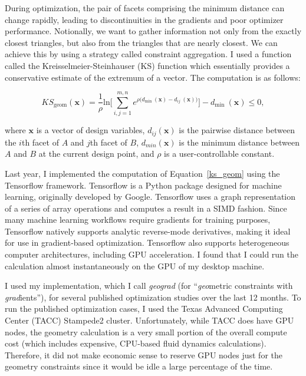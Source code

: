 \documentclass[11pt,letterpaper]{article}
\begin{document}
\qquad During optimization, the pair of facets comprising the minimum distance can change rapidly, leading to discontinuities in the gradients and poor optimizer performance.
Notionally, we want to gather information not only from the exactly closest triangles, but also from the triangles that are nearly closest.
We can achieve this by using a strategy called constraint aggregation.
I used a function called the Kreisselmeier-Steinhauser (KS) function which essentially provides a conservative estimate of the extremum of a vector.
The computation is as follows:

\begin{equation}
  \label{ks_geom}
  KS_\text{geom}(\textbf{x}) = \frac{1}{\rho} \textrm{ln} \Bigg[\sum_{i,j=1}^{m,n} e^{\rho\big(d_\text{min}\:(\textbf{x})-d_{ij}\:(\textbf{x})\big)}\Bigg] - d_\text{min}\:(\textbf{x}) \leq 0 ,
\end{equation}

where $\textbf{x}$ is a vector of design variables,
$d_{ij}(\textbf{x})$ is the pairwise distance between the $i$th facet of $A$ and $j$th facet of $B$,
$d_{min}(\textbf{x})$ is the minimum distance between $A$ and $B$ at the current design point, and
$\rho$ is a user-controllable constant.

\qquad Last year, I implemented the computation of Equation~\ref{ks_geom} using the Tensorflow framework. %
Tensorflow is a Python package designed for machine learning, originally developed by Google.
Tensorflow uses a graph representation of a series of array operations and computes a result in a SIMD fashion.
Since many machine learning workflows require gradients for training purposes, Tensorflow natively supports analytic reverse-mode derivatives, making it ideal for use in gradient-based optimization.
Tensorflow also supports heterogeneous computer architectures, including GPU acceleration.
I found that I could run the calculation almost instantaneously on the GPU of my desktop machine. 

\qquad I used my implementation, which I call \emph{geograd} (for ``\emph{geo}metric constraints with \emph{grad}ients''), for several published optimization studies over the last 12 months. %
To run the published optimization cases, I used the Texas Advanced Computing Center (TACC) Stampede2 cluster.
Unfortunately, while TACC does have GPU nodes, the geometry calculation is a very small portion of the overall compute cost (which includes expensive, CPU-based fluid dynamics calculations).
Therefore, it did not make economic sense to reserve GPU nodes just for the geometry constraints since it would be idle a large percentage of the time.
\end{document}
